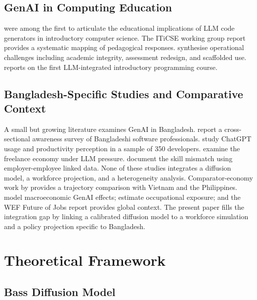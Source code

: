 \documentclass[11pt,a4paper]{article}
\begin{document}
\subsection{GenAI in Computing Education}

\citet{BeckerDennyPratherEtAl2023} were among the first to articulate
the educational implications of LLM code generators in introductory
computer science. The ITiCSE working group report
\citep{PratherEtAl2024} provides a systematic mapping of pedagogical
responses. \citet{DennyEtAl2024} synthesise operational challenges
including academic integrity, assessment redesign, and scaffolded use.
\citet{Vadaparty2025} reports on the first LLM-integrated introductory
programming course.

\subsection{Bangladesh-Specific Studies and Comparative Context}

A small but growing literature examines GenAI in Bangladesh.
\citet{IslamKabir2025} report a cross-sectional awareness survey of
Bangladeshi software professionals. \citet{RahmanSarker2024} study
ChatGPT usage and productivity perception in a sample of 350
developers. \citet{KaramSiddiqueAlam2025} examine the freelance
economy under LLM pressure. \citet{ChowdhuryRahman2025} document the
skill mismatch using employer-employee linked data. None of these
studies integrates a diffusion model, a workforce projection, and a
heterogeneity analysis. Comparator-economy work by
\citet{ParveenRaza2024} provides a trajectory comparison with
Vietnam and the Philippines. \citet{AcemogluRestrepo2024} model
macroeconomic GenAI effects; \citet{Eloundou2024GPTsAreGPTs} estimate
occupational exposure; and the WEF Future of Jobs report
\citep{WEFFutureOfJobs2025} provides global context. The present
paper fills the integration gap by linking a calibrated diffusion
model to a workforce simulation and a policy projection specific to
Bangladesh.

\section{Theoretical Framework}

\subsection{Bass Diffusion Model}
\end{document}
